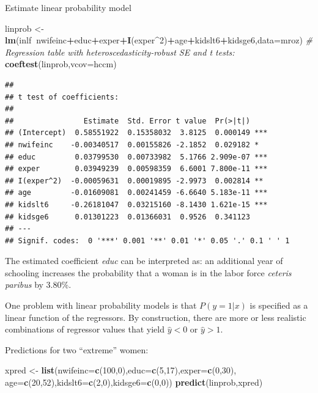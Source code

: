 \documentclass[]{book}
\newenvironment{Shaded}{\begin{snugshade}}{\end{snugshade}}
\newcommand{\CommentTok}[1]{\textcolor[rgb]{0.56,0.35,0.01}{\textit{#1}}}
\newcommand{\DataTypeTok}[1]{\textcolor[rgb]{0.13,0.29,0.53}{#1}}
\newcommand{\DecValTok}[1]{\textcolor[rgb]{0.00,0.00,0.81}{#1}}
\newcommand{\KeywordTok}[1]{\textcolor[rgb]{0.13,0.29,0.53}{\textbf{#1}}}
\newcommand{\NormalTok}[1]{#1}
\newcommand{\OperatorTok}[1]{\textcolor[rgb]{0.81,0.36,0.00}{\textbf{#1}}}
\newcommand{\StringTok}[1]{\textcolor[rgb]{0.31,0.60,0.02}{#1}}
\begin{document}
Estimate linear probability model

\begin{Shaded}
\begin{Highlighting}[]
\NormalTok{linprob <-}\StringTok{ }\KeywordTok{lm}\NormalTok{(inlf}\OperatorTok{~}\NormalTok{nwifeinc}\OperatorTok{+}\NormalTok{educ}\OperatorTok{+}\NormalTok{exper}\OperatorTok{+}\KeywordTok{I}\NormalTok{(exper}\OperatorTok{^}\DecValTok{2}\NormalTok{)}\OperatorTok{+}\NormalTok{age}\OperatorTok{+}\NormalTok{kidslt6}\OperatorTok{+}\NormalTok{kidsge6,}\DataTypeTok{data=}\NormalTok{mroz)}
\CommentTok{# Regression table with heteroscedasticity-robust SE and t tests:}
\KeywordTok{coeftest}\NormalTok{(linprob,}\DataTypeTok{vcov=}\NormalTok{hccm)}
\end{Highlighting}
\end{Shaded}

\begin{verbatim}
## 
## t test of coefficients:
## 
##                Estimate  Std. Error t value  Pr(>|t|)    
## (Intercept)  0.58551922  0.15358032  3.8125  0.000149 ***
## nwifeinc    -0.00340517  0.00155826 -2.1852  0.029182 *  
## educ         0.03799530  0.00733982  5.1766 2.909e-07 ***
## exper        0.03949239  0.00598359  6.6001 7.800e-11 ***
## I(exper^2)  -0.00059631  0.00019895 -2.9973  0.002814 ** 
## age         -0.01609081  0.00241459 -6.6640 5.183e-11 ***
## kidslt6     -0.26181047  0.03215160 -8.1430 1.621e-15 ***
## kidsge6      0.01301223  0.01366031  0.9526  0.341123    
## ---
## Signif. codes:  0 '***' 0.001 '**' 0.01 '*' 0.05 '.' 0.1 ' ' 1
\end{verbatim}

The estimated coefficient \emph{educ} can be interpreted as: an additional year of schooling increases the probability that a woman is in the labor force \emph{ceteris paribus} by 3.80\%.

One problem with linear probability models is that \(P(y=1|x)\) is specified as a linear function of the regressors. By construction, there are more or less realistic combinations of regressor values that yield \(\hat{y} < 0\) or \(\hat{y} > 1\).

Predictions for two ``extreme'' women:

\begin{Shaded}
\begin{Highlighting}[]
\NormalTok{xpred <-}\StringTok{ }\KeywordTok{list}\NormalTok{(}\DataTypeTok{nwifeinc=}\KeywordTok{c}\NormalTok{(}\DecValTok{100}\NormalTok{,}\DecValTok{0}\NormalTok{),}\DataTypeTok{educ=}\KeywordTok{c}\NormalTok{(}\DecValTok{5}\NormalTok{,}\DecValTok{17}\NormalTok{),}\DataTypeTok{exper=}\KeywordTok{c}\NormalTok{(}\DecValTok{0}\NormalTok{,}\DecValTok{30}\NormalTok{),}
              \DataTypeTok{age=}\KeywordTok{c}\NormalTok{(}\DecValTok{20}\NormalTok{,}\DecValTok{52}\NormalTok{),}\DataTypeTok{kidslt6=}\KeywordTok{c}\NormalTok{(}\DecValTok{2}\NormalTok{,}\DecValTok{0}\NormalTok{),}\DataTypeTok{kidsge6=}\KeywordTok{c}\NormalTok{(}\DecValTok{0}\NormalTok{,}\DecValTok{0}\NormalTok{))}
\KeywordTok{predict}\NormalTok{(linprob,xpred)}
\end{Highlighting}
\end{Shaded}
\end{document}
